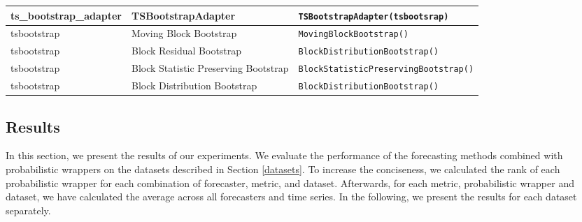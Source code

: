 \documentclass{article}
\begin{document}
\begin{table}[]
\begin{tabular}{p{2.5cm}p{4cm}|p{7.5cm}}
         ts\_bootstrap\_adapter & TSBootstrapAdapter & \texttt{TSBootstrapAdapter(tsbootsrap)} \\
         \midrule
 
         tsbootstrap & Moving Block Bootstrap & \texttt{MovingBlockBootstrap()} \\
         tsbootstrap & Block Residual Bootstrap & \texttt{BlockDistributionBootstrap()} \\
         tsbootstrap & Block Statistic Preserving Bootstrap & \texttt{BlockStatisticPreservingBootstrap()} \\
         tsbootstrap & Block Distribution Bootstrap & \texttt{BlockDistributionBootstrap()}\\

         \bottomrule
         
    \end{tabular}
\end{table}




\subsection{Results} \label{results}
In this section, we present the results of our experiments. We evaluate the performance of the forecasting methods combined with probabilistic wrappers on the datasets described in Section \ref{datasets}. 
To increase the conciseness, we calculated the rank of each probabilistic wrapper for each combination of forecaster, metric, and dataset. Afterwards, for each metric, probabilistic wrapper and dataset, we have calculated the average across all forecasters and time series. In the following, we present the results for each dataset separately. 
\end{document}
